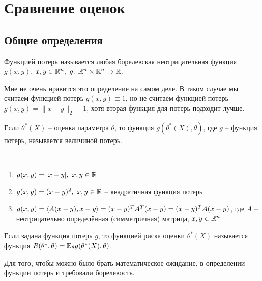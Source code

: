 \section{Сравнение оценок}

\subsection{Общие определения}

\begin{definition}
    Функцией потерь называется любая борелевская неотрицательная функция $g(x, y)$, $x, y \in \mathbb{R}^n,\ g \colon \mathbb{R}^n \times \mathbb{R}^n \to \mathbb{R}$.
\end{definition}

\begin{note}
    Мне не очень нравится это определение на самом деле. В таком случае мы считаем функцией потерь $g(x, y) \equiv 1$, но не считаем функцией потерь $g(x, y) = \|x - y\|_2 - 1$, хотя вторая функция для потерь подходит лучше.
\end{note}

\begin{definition}
    Если $\theta^*(X)$ -- оценка параметра $\theta$, то функция $g(\theta^*(X), \theta)$, где $g$ -- функция потерь, называется величиной потерь.
\end{definition}

\begin{example}~
    \begin{enumerate}
        \item $g(x, y) = |x-y|,\ x, y \in \mathbb{R}$
        \item $g(x, y) = (x-y)^2,\ x, y \in \mathbb{R}$ -- квадратичная функция потерь
        \item $g(x, y) = \left\langle A(x-y), x-y\right\rangle = (x-y)^T A^T (x-y) = (x-y)^T A (x-y)$, где $A$ -- неотрицательно определённая (симметричная) матрица, $x, y \in \mathbb{R}^n$
    \end{enumerate}
\end{example}

\begin{definition}
    Если задана функция потерь $g$, то функцией риска оценки $\theta^*(X)$ называется функция $R(\theta^*, \theta) = \mathbb{E}_\theta g(\theta^*(X), \theta)$.
\end{definition}

\begin{note}
    Для того, чтобы можно было брать математическое ожидание, в определении функции потерь и требовали борелевость.
\end{note}

